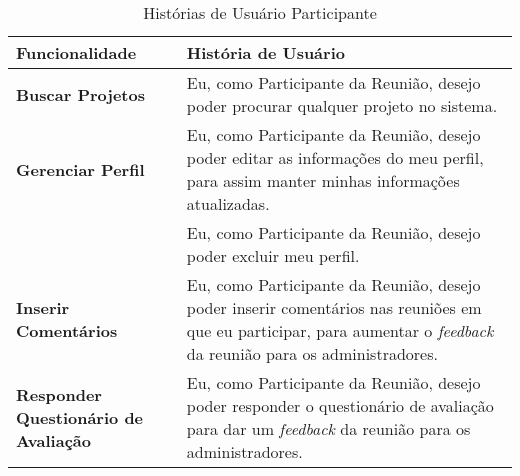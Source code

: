 \begin{table}[H]
	\begin{tabular}{|p{5.0cm}|p{10.0cm}|} 
	\hline
	\textbf{Funcionalidade} & \textbf{História de Usuário} \\ \hline
	\textbf{Buscar Projetos} & Eu, como Participante da Reunião, desejo poder procurar qualquer projeto no sistema. \\ \hline
	\textbf{Gerenciar Perfil} & Eu, como Participante da Reunião, desejo poder editar as informações do meu perfil, para assim manter minhas informações atualizadas. \\ \hline
	& Eu, como Participante da Reunião, desejo poder excluir meu perfil. \\ \hline
	\textbf{Inserir Comentários} & Eu, como Participante da Reunião, desejo poder inserir comentários nas reuniões em que eu participar, para aumentar o \textit{feedback} da reunião para os administradores. \\ \hline
	\textbf{Responder Questionário de Avaliação} & Eu, como Participante da Reunião, desejo poder responder o questionário de avaliação para dar um \textit{feedback} da reunião para os administradores.\\ \hline
	\end{tabular}
	 \caption{Histórias de Usuário Participante }
	 \label{tab:historias_de_usuario_participante_parte1}
\end{table}